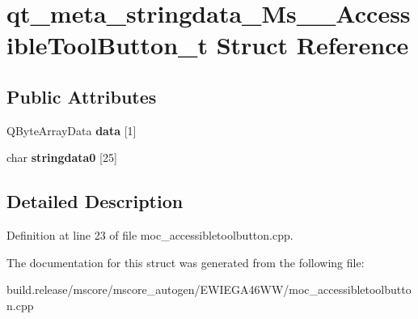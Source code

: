 \hypertarget{structqt__meta__stringdata___ms_____accessible_tool_button__t}{}\section{qt\+\_\+meta\+\_\+stringdata\+\_\+\+Ms\+\_\+\+\_\+\+Accessible\+Tool\+Button\+\_\+t Struct Reference}
\label{structqt__meta__stringdata___ms_____accessible_tool_button__t}
\subsection*{Public Attributes}
\begin{DoxyCompactItemize}
\item 
\mbox{\label{structqt__meta__stringdata___ms_____accessible_tool_button__t_a614fa7e6c768cb50da7f8f2b4676af98}} 
Q\+Byte\+Array\+Data {\bfseries data} \mbox{[}1\mbox{]}
\item 
\mbox{\label{structqt__meta__stringdata___ms_____accessible_tool_button__t_ace64e8df94fa51f4a4e9c0b79521dd74}} 
char {\bfseries stringdata0} \mbox{[}25\mbox{]}
\end{DoxyCompactItemize}


\subsection{Detailed Description}


Definition at line 23 of file moc\+\_\+accessibletoolbutton.\+cpp.



The documentation for this struct was generated from the following file\+:\begin{DoxyCompactItemize}
\item 
build.\+release/mscore/mscore\+\_\+autogen/\+E\+W\+I\+E\+G\+A46\+W\+W/moc\+\_\+accessibletoolbutton.\+cpp\end{DoxyCompactItemize}
